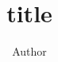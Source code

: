 \documentclass[stu,hidelinks,donotrepeattitle,floatsintext]{apa7}
\title{
  title
}
\author{
  Author
  \vspace*{2em}
}
\affiliation{
  {department, university}
}
\begin{document}
\maketitle

\nocite{*}
\printbibliography
\end{document}
